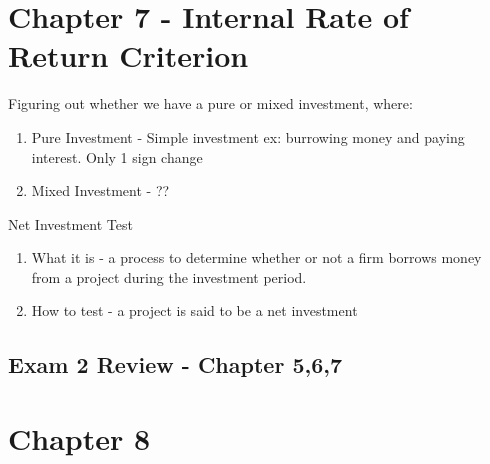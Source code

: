 \documentclass{report} %
\begin{document}
\section*{Chapter 7 - Internal Rate of Return Criterion}
Figuring out whether we have a pure or mixed investment, where:
\begin{enumerate}
    \item Pure Investment - Simple investment ex: burrowing money and paying interest. Only 1 sign change
    \item Mixed Investment - ??
\end{enumerate}
Net Investment Test
\begin{enumerate}
    \item What it is - a process to determine whether or not a firm borrows money from a project during the investment period.
    \item How to test - a project is said to be a net investment
\end{enumerate}

\subsection*{Exam 2 Review - Chapter 5,6,7}
\section*{Chapter 8}
\end{document}
